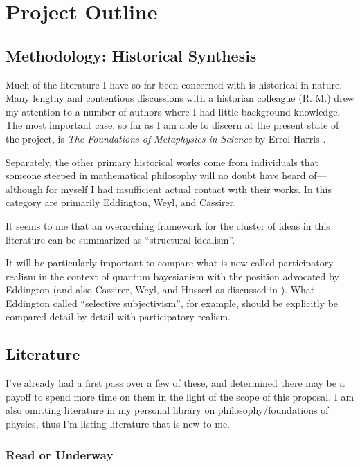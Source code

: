 \section{Project Outline}

\subsection{Methodology: Historical Synthesis}

Much of the literature I have so far been concerned with is historical in nature.  Many lengthy and contentious discussions with a historian colleague (R. M.) drew my attention to a number of authors where I had little background knowledge.  The most important case, so far as I am able to discern at the present state of the project, is \emph{The Foundations of Metaphysics in Science} by Errol Harris \citep{Harris1965}. 

Separately, the other primary historical works come from individuals that someone steeped in mathematical philosophy will no doubt have heard of---although for myself I had insufficient actual contact with their works.  In this category are primarily Eddington, Weyl, and Cassirer.  





It seems to me that an overarching framework for the cluster of ideas in this literature can be summarized as ``structural idealism''. 

It will be particularly important to compare what is now called participatory realism in the context of quantum bayesianism with the position advocated by Eddington (and also Cassirer, Weyl, and Husserl as discussed in \cite{Ryckman2005}).  What Eddington called ``selective subjectivism'', for example, should be explicitly be compared detail by detail with participatory realism. 


\subsection{Literature}

I've already had a first pass over a few of these, and determined there may be a payoff to spend more time on them in the light of the scope of this proposal.  I am also omitting literature in my personal library on philosophy/foundations of physics, thus I'm listing literature that is new to me. 

\subsubsection{Read or Underway}

